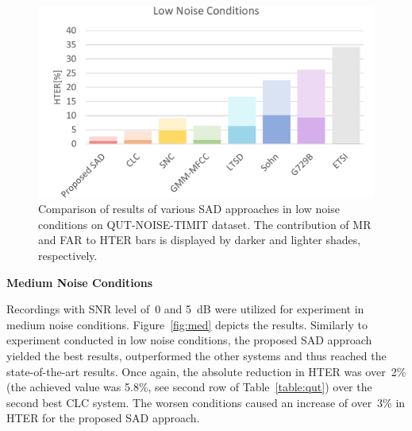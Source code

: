 \documentclass[FM,noheader,EN,bwtitles]{tulthesis}
\begin{document}
\begin{figure}
\centering
\includegraphics[scale=0.5]{img/gLow.pdf}
\caption{Comparison of results of various SAD approaches in low noise conditions on QUT-NOISE-TIMIT dataset. The contribution of MR and FAR to HTER bars is displayed by darker and lighter shades, respectively.}
\label{fig:low}
\end{figure}

\bigskip
\noindent
\textbf{Medium Noise Conditions}
\medskip

\noindent
Recordings with SNR level of~0 and 5~dB were utilized for experiment in medium noise conditions.
Figure~\ref{fig:med} depicts the results.
Similarly to experiment conducted in low noise conditions, the proposed SAD approach yielded the best results, outperformed the other systems and thus reached the state-of-the-art results.
Once again, the absolute reduction in HTER was over~2\% (the achieved value was 5.8\%, see second row of Table~\ref{table:qut}) over the second best CLC system.
The worsen conditions caused an increase of over~3\% in HTER for the proposed SAD approach.

\end{document}
